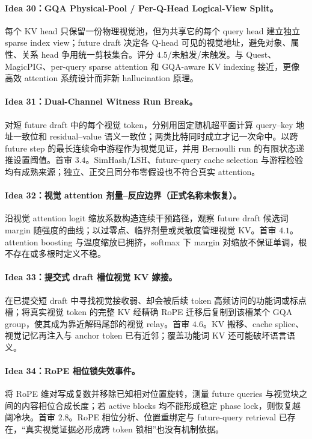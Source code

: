 \documentclass[UTF8,zihao=-4,a4paper]{ctexart}
\begin{document}
\paragraph{Idea 30：GQA Physical-Pool / Per-Q-Head Logical-View Split。}
每个 KV head 只保留一份物理视觉池，但为共享它的每个 query head 建立独立 sparse index view；future draft 决定各 Q-head 可见的视觉地址，避免对象、属性、关系 head 争用统一剪枝集合。评分 $4.5$/未触发/未触发。与 Quest、MagicPIG、per-query sparse attention 和 GQA-aware KV indexing 接近，更像高效 attention 系统设计而非新 hallucination 原理。

\paragraph{Idea 31：Dual-Channel Witness Run Break。}
对短 future draft 中的每个视觉 token，分别用固定随机超平面计算 query--key 地址一致位和 residual--value 语义一致位；两类比特同时成立才记一次命中。以跨 future step 的最长连续命中游程作为视觉见证，并用 Bernoulli run 的有限状态递推设置阈值。首审 $3.4$。SimHash/LSH、future-query cache selection 与游程检验均有成熟来源；独立、正交且同分布零假设也不符合真实 attention。

\paragraph{Idea 32：视觉 attention 剂量--反应边界（正式名称未恢复）。}
沿视觉 attention logit 缩放系数构造连续干预路径，观察 future draft 候选词 margin 随强度的曲线；以过零点、临界剂量或灵敏度管理视觉 KV。首审 $4.1$。attention boosting 与温度缩放已拥挤，softmax 下 margin 对缩放不保证单调，根不存在或多根时定义不稳。

\paragraph{Idea 33：提交式 draft 槽位视觉 KV 嫁接。}
在已提交短 draft 中寻找视觉接收弱、却会被后续 token 高频访问的功能词或标点槽；将真实视觉 token 的完整 KV 经精确 RoPE 迁移后复制到该槽某个 GQA group，使其成为靠近解码尾部的视觉 relay。首审 $4.6$。KV 搬移、cache splice、视觉记忆再注入与 anchor token 已有近邻；覆盖功能词 KV 还可能破坏语言语义。

\paragraph{Idea 34：RoPE 相位锁失效事件。}
将 RoPE 维对写成复数并移除已知相对位置旋转，测量 future queries 与视觉块之间的内容相位合成长度；若 active blocks 均不能形成稳定 phase lock，则恢复越阈冷块。首审 $2.8$。RoPE 相位分析、位置重绑定与 future-query retrieval 已存在，“真实视觉证据必形成跨 token 锁相”也没有机制依据。
\end{document}
